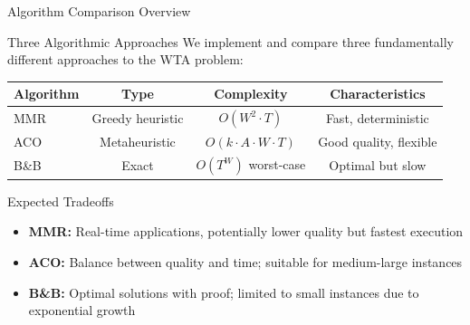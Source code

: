 \documentclass[aspectratio=43,8pt]{beamer}
\begin{document}
\begin{frame}{Algorithm Comparison Overview}
\begin{block}{Three Algorithmic Approaches}
We implement and compare three fundamentally different approaches to the WTA problem:
\end{block}

\vspace{0.2cm}
\begin{table}[h]
\centering
\begin{tabular}{lccc}
\toprule
\textbf{Algorithm} & \textbf{Type} & \textbf{Complexity} & \textbf{Characteristics} \\
\midrule
MMR & Greedy heuristic & $O(W^2 \cdot T)$ & Fast, deterministic \\
ACO & Metaheuristic & $O(k \cdot A \cdot W \cdot T)$ & Good quality, flexible \\
B\&B & Exact & $O(T^W)$ worst-case & \textcolor{accentgreen}{Optimal} but slow \\
\bottomrule
\end{tabular}
\end{table}

\vspace{0.3cm}
\begin{exampleblock}{Expected Tradeoffs}
\begin{itemize}
    \item \textbf{MMR:} Real-time applications, potentially lower quality but fastest execution
    \item \textbf{ACO:} Balance between quality and time; suitable for medium-large instances
    \item \textbf{B\&B:} Optimal solutions with proof; limited to small instances due to exponential growth
\end{itemize}
\end{exampleblock}
\end{frame}
\end{document}
